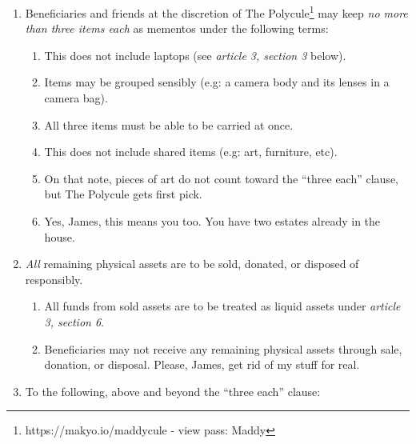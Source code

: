 \begin{enumerate}
\def\labelenumi{\arabic{enumi}.}
\tightlist
\item
  Beneficiaries and friends at the discretion of The Polycule\footnote{https://makyo.io/maddycule - view pass: Maddy} may keep \emph{no more than three items each} as mementos under the following terms:

  \begin{enumerate}
  \def\labelenumii{\arabic{enumii}.}
  \tightlist
  \item
    This does not include laptops (see \emph{article 3, section 3} below).
  \item
    Items may be grouped sensibly (e.g: a camera body and its lenses in a camera bag).
  \item
    All three items must be able to be carried at once.
  \item
    This does not include shared items (e.g: art, furniture, etc).
  \item
    On that note, pieces of art do not count toward the ``three each'' clause, but The Polycule gets first pick.
  \item
    Yes, James, this means you too. You have two estates already in the house.
  \end{enumerate}
\item
  \emph{All} remaining physical assets are to be sold, donated, or disposed of responsibly.

  \begin{enumerate}
  \def\labelenumii{\arabic{enumii}.}
  \tightlist
  \item
    All funds from sold assets are to be treated as liquid assets under \emph{article 3, section 6}.
  \item
    Beneficiaries may not receive any remaining physical assets through sale, donation, or disposal. Please, James, get rid of my stuff for real.
  \end{enumerate}
\item
  To the following, above and beyond the ``three each'' clause:


\end{enumerate}
